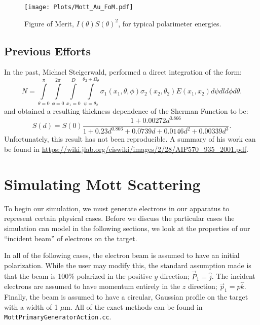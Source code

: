 \documentclass[11pt]{article}
\begin{document}
\begin{figure}[!h]
 \centering
 \texttt{[image: Plots/Mott\_Au\_FoM.pdf]}
 \caption{Figure of Merit, $I(\theta)S(\theta)^2$, for typical polarimeter energies.} 
\label{fig:FoM}
\end{figure}

\subsection{Previous Efforts}
In the past, Michael Steigerwald, performed a direct integration of the form:
\begin{equation}
N = \int\limits_{\theta = 0}^{\pi} \int\limits_{\phi = 0}^{2\pi} \int\limits_{x_1 = 0}^{D} \int\limits_{\psi=\theta_{2}}^{\theta_2+\Omega_\theta}\sigma_1(x_1,\theta, \phi)\sigma_2(x_2,\theta_2)E(x_1,x_2) d\psi dl d\phi d\theta.
\end{equation}
and obtained a resulting thickness dependence of the Sherman Function to be:
\begin{equation}
S(d) = S(0)\frac{1 + 0.00272d^{0.866}}{1 + 0.23d^{0.866} + 0.0739d + 0.0146d^2+ 0.00339d^3}.
\end{equation}
Unfortunately, this result has not been reproducible. A summary of his work can be found in \url{https://wiki.jlab.org/ciswiki/images/2/28/AIP570_935_2001.pdf}.

\section{Simulating Mott Scattering}

To begin our simulation, we must generate electrons in our apparatus to represent certain physical cases. Before we discuss the particular cases the simulation can model in the following sections, we look at the properties of our ``incident beam'' of electrons on the target. 

In all of the following cases, the electron beam is assumed to have an initial polarization. While the user may modify this, the standard assumption made is that the beam is 100\% polarized in the positive $y$ direction; $\vec{P}_1 = \hat{j}$. The incident electrons are assumed to have momentum entirely in the $z$ direction; $\vec{p}_1 = p \hat{k}$. Finally, the beam is assumed to have a circular, Gaussian profile on the target with a width of 1 $\mu$m. All of the exact methods can be found in \texttt{MottPrimaryGeneratorAction.cc}.
\end{document}
